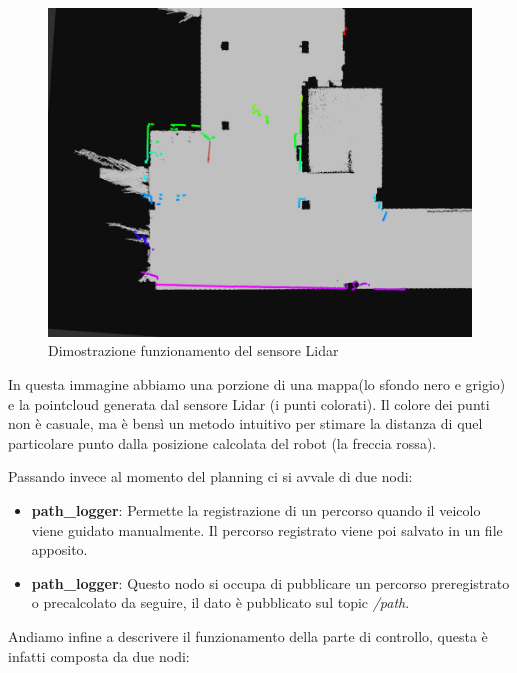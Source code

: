 \begin{figure}[H]
  \centering
  \includegraphics[width=1\textwidth]{figures/lidar_map.png}
  \caption{Dimostrazione funzionamento del sensore Lidar}
  \label{Dimostrazione funzionamento del sensore Lidar}
\end{figure}

\noindent In questa immagine abbiamo una porzione di una mappa(lo sfondo nero e grigio) e la pointcloud generata dal sensore Lidar (i punti colorati). Il colore dei punti non è casuale, ma è bensì un metodo intuitivo per stimare la distanza di quel particolare punto dalla posizione calcolata del robot (la freccia rossa).

\noindent Passando invece al momento del planning ci si avvale di due nodi:

\begin{itemize}
  \item \textbf{path\_logger}: Permette la registrazione di un percorso quando il veicolo viene guidato manualmente. Il percorso registrato viene poi salvato in un file apposito.
  \item \textbf{path\_logger}: Questo nodo si occupa di pubblicare un percorso preregistrato o precalcolato da seguire, il dato è pubblicato sul topic \textit{/path}.  
\end{itemize}

\noindent Andiamo infine a descrivere il funzionamento della parte di controllo, questa è infatti composta da due nodi:

